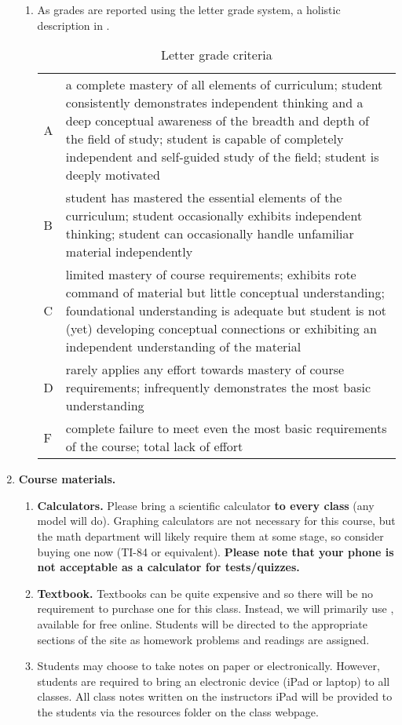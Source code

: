 \documentclass{article}
\begin{document}
\begin{enumerate}
\begin{enumerate}
\item As grades are reported using the letter grade system, a holistic description in .
\begin{table}[h]
\caption{Letter grade criteria}
\label{tab:grades}
\begin{center}
\small
\begin{tabular}{lp{4in}}
\toprule
A & a complete mastery of all elements of curriculum; student consistently demonstrates independent thinking and a deep conceptual awareness of the breadth and depth of the field of study; student is capable of completely independent and self-guided study of the field; student is deeply motivated \\
B & student has mastered the essential elements of the curriculum; student occasionally exhibits independent thinking; student can occasionally handle unfamiliar material independently \\
C & limited mastery of course requirements; exhibits rote command of material but little conceptual understanding; foundational understanding is adequate but student is not (yet) developing conceptual connections or exhibiting an independent
understanding of the material \\
D & rarely applies any effort towards mastery of course requirements; infrequently demonstrates the most basic understanding\\
F & complete failure to meet even the most basic requirements of the course; total lack of effort \\
\bottomrule
\end{tabular}
\end{center}
\end{table}
\end{enumerate}

\item \textbf{Course materials.}
\begin{enumerate}
\item \textbf{Calculators.}  Please bring a scientific calculator \textbf{to every class} (any model will do). Graphing calculators are not necessary for this course, but the math department will likely require them at some stage, so consider buying one now (TI-84 or equivalent). \textbf{Please note that your phone is not acceptable as a calculator for tests/quizzes.}
\item \textbf{Textbook.} Textbooks can be quite expensive and so there will be no requirement to purchase one for this class. Instead, we will primarily use , available for free online. Students will be directed to the appropriate sections of the site as homework problems and readings are assigned.
\item Students may choose to take notes on paper or electronically. However, students are required to bring an electronic device (iPad or laptop) to all classes. All class notes written on the instructors iPad will be provided to the students via the resources folder on the class webpage.
\end{enumerate}


\end{enumerate}
\end{document}
